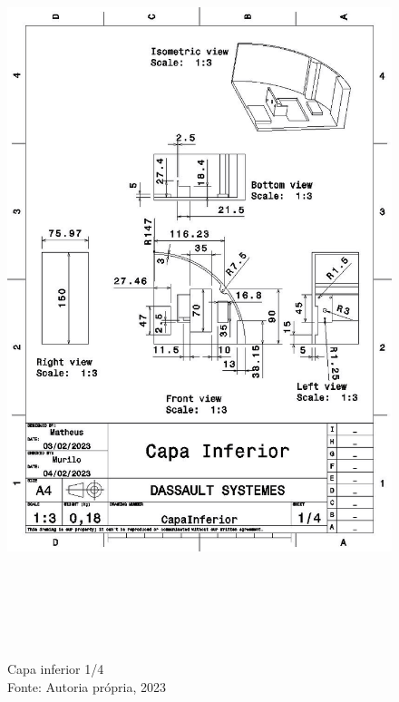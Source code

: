 \newpage
\pagebreak
\begin{figure}[h!]
\centering
\includegraphics[width=16cm,height=22cm]{figuras/CapaInferior1_4.jpg}
\caption{Capa inferior 1/4\\Fonte: Autoria própria, 2023}
\label{CapaInferior1_4}
\end{figure}

